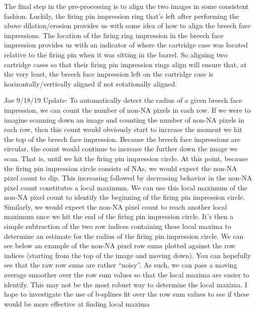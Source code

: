 \documentclass[]{book}
\begin{document}
The final step in the pre-processing is to align the two images in some consistent fashion. Luckily, the firing pin impression ring that's left after performing the above dilation/erosion provides us with some idea of how to align the breech face impressions. The location of the firing ring impression in the breech face impression provides us with an indicator of where the cartridge case was located relative to the firing pin when it was sitting in the barrel. So aligning two cartridge cases so that their firing pin impression rings align will ensure that, at the very least, the breech face impression left on the cartridge case is horizontally/vertically aligned if not rotationally aligned.

Joe 9/18/19 Update: To automatically detect the radius of a given breech face impression, we can count the number of non-NA pixels in each row. If we were to imagine scanning down an image and counting the number of non-NA pixels in each row, then this count would obviously start to increase the moment we hit the top of the breech face impression. Because the breech face impressions are circular, the count would continue to increase the further down the image we scan. That is, until we hit the firing pin impression circle. At this point, because the firing pin impression circle consists of NAs, we would expect the non-NA pixel count to dip. This increasing followed by decreasing behavior in the non-NA pixel count constitutes a local maximum. We can use this local maximum of the non-NA pixel count to identify the beginning of the firing pin impression circle. Similarly, we would expect the non-NA pixel count to reach another local maximum once we hit the end of the firing pin impression circle. It's then a simple subtraction of the two row indices containing these local maxima to determine an estimate for the radius of the firing pin impression circle. We can see below an example of the non-NA pixel row sums plotted against the row indices (starting from the top of the image and moving down). You can hopefully see that the raw row sums are rather ``noisy''. As such, we can pass a moving average smoother over the row sum values so that the local maxima are easier to identify. This may not be the most robust way to determine the local maxima. I hope to investigate the use of b-splines fit over the row sum values to see if these would be more effective at finding local maxima
\end{document}

